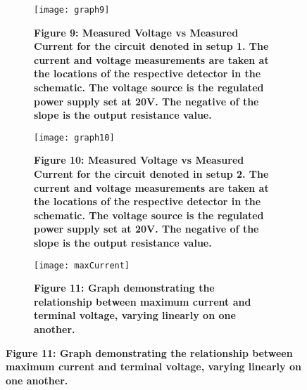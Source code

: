 \begin{figure}[H]
	\begin{subfigure}{0.45\textwidth}
		\texttt{[image: graph9]}
		\caption{\textbf{Figure 9: Measured Voltage vs Measured Current for the circuit denoted in setup 1. The current and voltage measurements are taken at the locations of the respective detector in the schematic. The voltage source is the regulated power supply set at 20V. The negative of the slope is the output resistance value.}}
	\end{subfigure}
    \hspace{0.08\textwidth}
	\begin{subfigure}{0.45\textwidth}
		\texttt{[image: graph10]}
		\caption{\textbf{Figure 10: Measured Voltage vs Measured Current for the circuit denoted in setup 2. The current and voltage measurements are taken at the locations of the respective detector in the schematic. The voltage source is the regulated power supply set at 20V. The negative of the slope is the output resistance value.}}
	\end{subfigure}
    \begin{subfigure}{0.45\textwidth}
		\texttt{[image: maxCurrent]}
		\caption{\textbf{Figure 11: Graph demonstrating the relationship between maximum current and terminal voltage, varying linearly on one another.}}
	\end{subfigure}
\end{figure}
